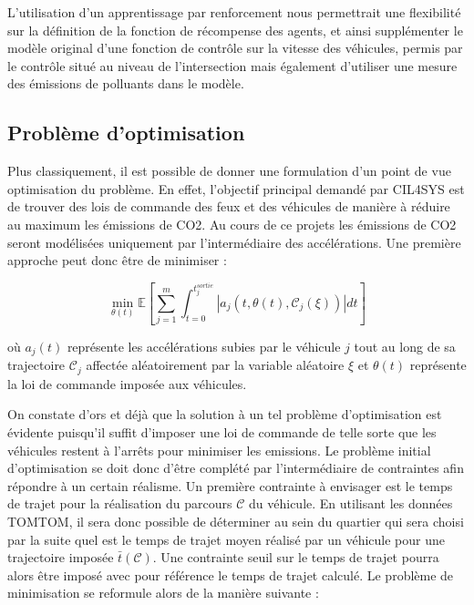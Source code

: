 \documentclass[11pt]{article}
\begin{document}
L'utilisation d'un apprentissage par renforcement nous permettrait une flexibilité sur la définition de la fonction de récompense des agents, et ainsi supplémenter le modèle original d'une fonction de contrôle sur la vitesse des véhicules, permis par le contrôle situé au niveau de l'intersection mais également d'utiliser une mesure des émissions de polluants dans le modèle.

\subsection{Problème d'optimisation}
\label{sec:orgbee0c14}

Plus classiquement, il est possible de donner une formulation d'un point de vue optimisation du problème. En effet, l'objectif principal demandé par CIL4SYS est de trouver des lois de commande des feux et des véhicules de manière à réduire au maximum les émissions de CO2. Au cours de ce projets les émissions de CO2 seront modélisées uniquement par l'intermédiaire des accélérations. Une première approche peut donc être de minimiser :

\begin{latex}
\[
\min_{\theta(t)}{\mathbb{E}\left [\sum_{j=1}^{m} \int_{t = 0}^{t^{sortie}_{j}}{ | a_{j}(t,\theta(t),\mathcal{C}_{j}(\xi)) | dt} \right ]}
\]
\end{latex}

où \(a_{j}(t)\) représente les accélérations subies par le véhicule \(j\) tout au long de sa trajectoire \(\mathcal{C}_{j}\) affectée aléatoirement par la variable aléatoire \(\xi\) et \(\theta(t)\) représente la loi de commande imposée aux véhicules.

On constate d'ors et déjà que la solution à un tel problème d'optimisation est évidente puisqu'il suffit d'imposer une loi de commande de telle sorte que les véhicules restent à l'arrêts pour minimiser les emissions. Le problème initial d'optimisation se doit donc d'être complété par l'intermédiaire de contraintes afin répondre à un certain réalisme. Un première contrainte à envisager est le temps de trajet pour la réalisation du parcours \(\mathcal{C}\) du véhicule. En utilisant les données TOMTOM, il sera donc possible de déterminer au sein du quartier qui sera choisi par la suite quel est le temps de trajet moyen réalisé par un véhicule pour une trajectoire imposée \(\bar{t}(\mathcal{C})\). Une contrainte seuil sur le temps de trajet pourra alors être imposé avec pour référence le temps de trajet calculé. Le problème de minimisation se reformule alors de la manière suivante :
\end{document}
